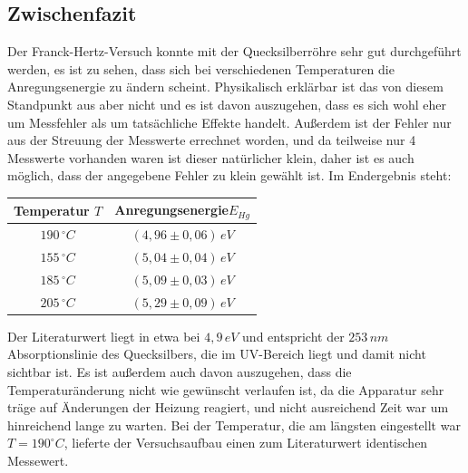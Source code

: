 \subsection{Zwischenfazit}
Der Franck-Hertz-Versuch konnte mit der Quecksilberröhre  sehr gut durchgeführt werden, es ist zu sehen, dass sich bei verschiedenen Temperaturen die Anregungsenergie zu ändern scheint. Physikalisch erklärbar ist das von diesem Standpunkt aus aber nicht und es ist davon auszugehen, dass es sich wohl eher um Messfehler als um tatsächliche Effekte handelt. Außerdem ist der Fehler nur aus der Streuung der Messwerte errechnet worden, und da teilweise nur 4 Messwerte vorhanden waren ist dieser natürlicher klein, daher ist es auch möglich, dass der angegebene Fehler zu klein gewählt ist. Im Endergebnis steht:
\begin{center}
\begin{tabular}{c|c}
Temperatur \(T\) & Anregungsenergie\(E_{Hg}\)\\\hline
\(190\, ^\circ C\) & \(\left( 4,96 \pm 0,06 \right) \, eV\) \\
\(155\, ^\circ C\) & \(\left( 5,04 \pm 0,04 \right) \, eV\) \\
\(185\, ^\circ C\) & \(\left( 5,09 \pm 0,03 \right) \, eV\) \\
\(205\, ^\circ C\) & \(\left( 5,29 \pm 0,09 \right) \, eV\) \\
\end{tabular}
\end{center}
Der Literaturwert liegt in etwa bei \(4,9\, eV\) und entspricht der  \(253\, nm\) Absorptionslinie des Quecksilbers, die im UV-Bereich liegt und damit nicht sichtbar ist. Es ist außerdem auch davon auszugehen, dass die Temperaturänderung nicht wie gewünscht verlaufen ist, da die Apparatur sehr träge auf Änderungen der Heizung reagiert, und nicht ausreichend Zeit war um hinreichend lange zu warten. Bei der Temperatur, die am längsten eingestellt war \(T=190^\circ C\), lieferte der Versuchsaufbau einen zum Literaturwert identischen Messewert.